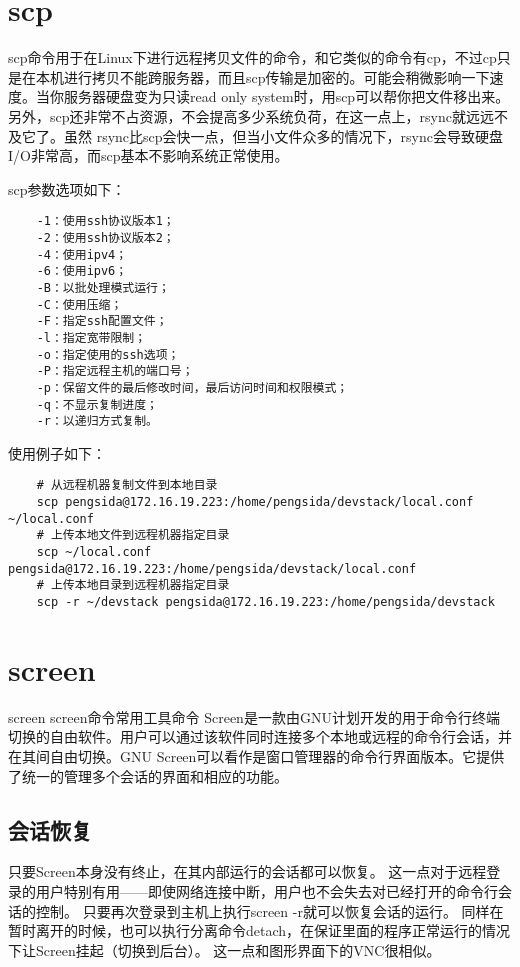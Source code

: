 \documentclass[a4paper,left=2.5cm,right=2.5cm,11pt]{article}
\begin{document}
\section{scp}
	scp命令用于在Linux下进行远程拷贝文件的命令，和它类似的命令有cp，不过cp只是在本机进行拷贝不能跨服务器，而且scp传输是加密的。可能会稍微影响一下速度。当你服务器硬盘变为只读read only system时，用scp可以帮你把文件移出来。另外，scp还非常不占资源，不会提高多少系统负荷，在这一点上，rsync就远远不及它了。虽然 rsync比scp会快一点，但当小文件众多的情况下，rsync会导致硬盘I/O非常高，而scp基本不影响系统正常使用。\par

	scp参数选项如下：
	\begin{lstlisting}
	-1：使用ssh协议版本1； 
	-2：使用ssh协议版本2； 
	-4：使用ipv4； 
	-6：使用ipv6； 
	-B：以批处理模式运行； 
	-C：使用压缩； 
	-F：指定ssh配置文件； 
	-l：指定宽带限制； 
	-o：指定使用的ssh选项； 
	-P：指定远程主机的端口号； 
	-p：保留文件的最后修改时间，最后访问时间和权限模式； 
	-q：不显示复制进度； 
	-r：以递归方式复制。
	\end{lstlisting}

	使用例子如下：
	\begin{lstlisting}
	# 从远程机器复制文件到本地目录
	scp pengsida@172.16.19.223:/home/pengsida/devstack/local.conf ~/local.conf
	# 上传本地文件到远程机器指定目录
	scp ~/local.conf pengsida@172.16.19.223:/home/pengsida/devstack/local.conf
	# 上传本地目录到远程机器指定目录
	scp -r ~/devstack pengsida@172.16.19.223:/home/pengsida/devstack
	\end{lstlisting}

\section{screen}
	screen screen命令常用工具命令 Screen是一款由GNU计划开发的用于命令行终端切换的自由软件。用户可以通过该软件同时连接多个本地或远程的命令行会话，并在其间自由切换。GNU Screen可以看作是窗口管理器的命令行界面版本。它提供了统一的管理多个会话的界面和相应的功能。

\subsection{会话恢复}
	只要Screen本身没有终止，在其内部运行的会话都可以恢复。
	这一点对于远程登录的用户特别有用——即使网络连接中断，用户也不会失去对已经打开的命令行会话的控制。
	只要再次登录到主机上执行screen -r就可以恢复会话的运行。
	同样在暂时离开的时候，也可以执行分离命令detach，在保证里面的程序正常运行的情况下让Screen挂起（切换到后台）。
	这一点和图形界面下的VNC很相似。
\end{document}
